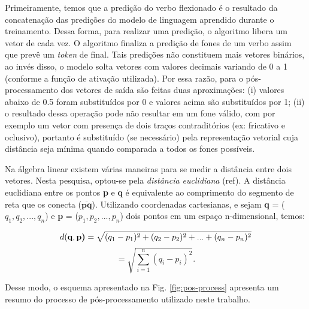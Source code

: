 Primeiramente, temos que a predição do verbo flexionado é o resultado da concatenação das predições do modelo de linguagem aprendido durante o treinamento. Dessa forma, para realizar uma predição, o algoritmo libera um vetor de cada vez. O algoritmo finaliza a predição de fones de um verbo assim que prevê um \textit{token} de final. Tais predições não constituem mais vetores binários, ao invés disso, o modelo solta vetores com valores decimais variando de 0 a 1 (conforme a função de ativação utilizada). Por essa razão, para o pós-processamento dos vetores de saída são feitas duas aproximações: (i) valores abaixo de 0.5 foram substituídos por 0 e valores acima são substituídos por 1; (ii) o resultado dessa operação pode não resultar em um fone válido, com por exemplo um vetor com presença de dois traços contraditórios (ex: fricativo e oclusivo), portanto é substituído (se necessário) pela representação vetorial cuja distância seja mínima quando comparada a todos os fones possíveis. 

Na álgebra linear existem várias maneiras para se medir a distância entre dois vetores. Nesta pesquisa, optou-se pela \textit{distância euclidiana} (ref). A distância euclidiana entre os pontos \textbf{p} e \textbf{q} é equivalente ao comprimento do segmento de reta que os conecta (${\displaystyle {\overline {\mathbf {p} \mathbf {q} }}}$). Utilizando coordenadas cartesianas, e sejam \textbf{q} = ($q_1, q_2, ..., q_n$) e \textbf{p} = ($p_1, p_2, ..., p_n$) dois pontos em um espaço n-dimensional, temos:

\begin{equation}
    d(\textbf{q}, \textbf{p)} = \sqrt{(q_1 - p_1)^2 + (q_2 - p_2)^2 + ... + (q_n - p_n)^2}\notag
\end{equation}
\begin{equation}
    = \sqrt{\sum_{i=1}^n (q_i-p_i)^2}.    
\end{equation}

Desse modo, o esquema apresentado na Fig. \ref{fig:pos-process} apresenta um resumo do processo de pós-processamento utilizado neste trabalho.


 



